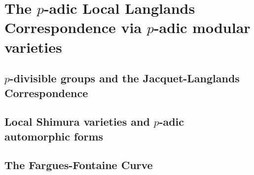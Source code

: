     \part{The \texorpdfstring{$p$}{}-adic Local Langlands Correspondence via \texorpdfstring{$p$}{}-adic modular varieties}
        \chapter{\texorpdfstring{$p$}{}-divisible groups and the Jacquet-Langlands Correspondence}
            \begin{abstract}
                
            \end{abstract}
            
            
            
            
            
        \chapter{Local Shimura varieties and \texorpdfstring{$p$}{}-adic automorphic forms}
            \begin{abstract}
                
            \end{abstract}
            
            \minitoc
    
        \chapter{The Fargues-Fontaine Curve}
            \begin{abstract}
                
            \end{abstract}
            
            \minitoc
            
            
            
            
            
            
        

